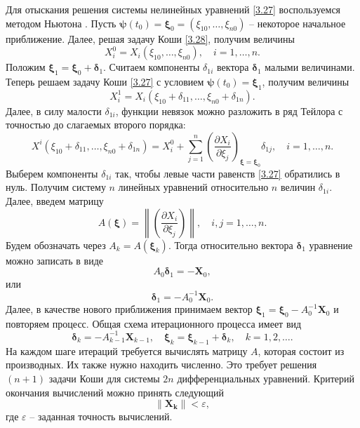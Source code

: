 \documentclass[a4paper,12pt, openany]{book}
\theoremstyle{plain} %
\theoremstyle{definition} %
\theoremstyle{remark} %
\numberwithin{equation}{chapter}
\begin{document}
{Для отыскания решения системы нелинейных уравнений \eqref{3.27} воспользуемся методом Ньютона \cite{Fedorenko}. Пусть $\bm\psi(t_0) = \bm\xi_0 = (\xi_{10},\ldots,\xi_{n0})$ -- некоторое начальное приближение. Далее, решая задачу Коши \eqref{3.28}, получим величины 
\begin{equation}\label{3.29}
X_i^0  = X_i \left( {\xi _{10} , \ldots ,\xi _{n0} } \right), \quad i=1,\ldots,n.
\end{equation}
Положим $\bm\xi_1 = \bm\xi_0 + \bm\delta_1$. Считаем компоненты $\delta_{1i}$ вектора $\bm\delta_1$ малыми величинами. Теперь решаем задачу Коши \eqref{3.27} с условием $\bm\psi(t_0) = \bm\xi_1$, получим величины $$
X_i^1  = X_i \left( {\xi _{10}  + \delta _{11} , \ldots ,\xi _{n0}  + \delta _{1n} } \right).
$$ Далее, в силу малости $\delta_{1i}$, функции невязок можно разложить в ряд Тейлора с точностью до слагаемых второго порядка: 
\begin{equation}\label{3.30}
X^i \left( {\xi _{10}  + \delta _{11} , \ldots ,\xi _{n0}  + \delta _{1n} } \right) = X_i^0  + \sum\limits_{j = 1}^n {\left( {\frac{{\partial X_i }}
{{\partial \xi _j }}} \right)_{\bm\xi  = \bm\xi _0 } \delta _{1j} , \quad i = 1, \ldots ,n.} 
\end{equation}
Выберем компоненты $\delta_{1i}$ так, чтобы левые части равенств \eqref{3.27} обратились в нуль. Получим систему $n$ линейных уравнений относительно $n$ величин $\delta_{1i}$. Далее, введем матрицу
\[
A\left( \bm\xi  \right) = \left\| {\left( {\frac{{\partial X_i }}
{{\partial \xi _j }}} \right)} \right\|, \quad i,j = 1, \ldots ,n.
\]
Будем обозначать через $A_k = A(\bm\xi_k)$. Тогда относительно вектора $\bm\delta_1$ уравнение можно записать в виде
\[
A_0 \bm\delta _1  =  - \bm X_0,
\]
или 
\begin{equation}\label{3.31}
\bm\delta _1  =  - A_0^{ - 1} \bm X_0 .
\end{equation}
Далее, в качестве нового приближения принимаем вектор $\bm\xi_1 = \bm\xi_0 - A_0^{-1}\bm X_0$ и повторяем процесс. Общая схема итерационного процесса имеет вид
\begin{equation}\label{3.32}
\bm\delta _k  =  - A_{k - 1}^{ - 1} \bm X_{k - 1} ,\quad \bm\xi _k  = \bm \xi _{k - 1}  + \bm\delta _k, \quad k = 1,2,\ldots.
\end{equation}
На каждом шаге итераций требуется вычислять матрицу $A$, которая состоит из производных. Их также нужно находить численно. Это требует решения $(n+1)$ задачи Коши для системы $2n$ дифференциальных уравнений. Критерий окончания вычислений можно принять следующий
\begin{equation}\label{3.33}
\left\| \bm{X_k } \right\| < \varepsilon,
\end{equation}
где $\varepsilon$ -- заданная точность вычислений. 

}
\end{document}
